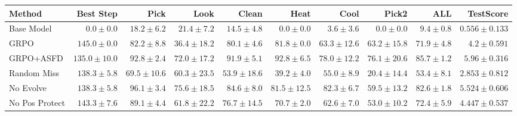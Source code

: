 \begin{tabular}{lrrrrrrrrr}
\toprule
Method & Best Step & Pick & Look & Clean & Heat & Cool & Pick2 & ALL & TestScore \\
\midrule
Base Model & $0.0 \pm 0.0$ & $18.2 \pm 6.2$ & $21.4 \pm 7.2$ & $14.5 \pm 4.8$ & $0.0 \pm 0.0$ & $3.6 \pm 3.6$ & $0.0 \pm 0.0$ & $9.4 \pm 0.8$ & $0.556 \pm 0.133$ \\
GRPO & $145.0 \pm 0.0$ & $82.2 \pm 8.8$ & $36.4 \pm 18.2$ & $80.1 \pm 4.6$ & $81.8 \pm 0.0$ & $63.3 \pm 12.6$ & $63.2 \pm 15.8$ & $71.9 \pm 4.8$ & $4.2 \pm 0.591$ \\
GRPO+ASFD & $135.0 \pm 10.0$ & $92.8 \pm 2.4$ & $72.0 \pm 17.2$ & $91.9 \pm 5.1$ & $92.8 \pm 6.5$ & $78.0 \pm 12.2$ & $76.1 \pm 20.6$ & $85.7 \pm 1.2$ & $5.96 \pm 0.316$ \\
Random Miss & $138.3 \pm 5.8$ & $69.5 \pm 10.6$ & $60.3 \pm 23.5$ & $53.9 \pm 18.6$ & $39.2 \pm 4.0$ & $55.0 \pm 8.9$ & $20.4 \pm 14.4$ & $53.4 \pm 8.1$ & $2.853 \pm 0.812$ \\
No Evolve & $138.3 \pm 5.8$ & $96.1 \pm 3.4$ & $75.6 \pm 18.5$ & $84.6 \pm 8.0$ & $81.5 \pm 12.5$ & $82.3 \pm 6.7$ & $59.5 \pm 13.2$ & $82.6 \pm 1.8$ & $5.524 \pm 0.606$ \\
No Pos Protect & $143.3 \pm 7.6$ & $89.1 \pm 4.4$ & $61.8 \pm 22.2$ & $76.7 \pm 14.5$ & $70.7 \pm 2.0$ & $62.6 \pm 7.0$ & $53.0 \pm 10.2$ & $72.4 \pm 5.9$ & $4.447 \pm 0.537$ \\
\bottomrule
\end{tabular}
